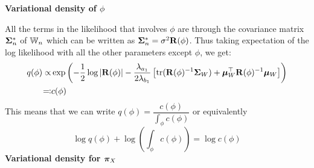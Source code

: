 \documentclass[numsec,webpdf,modern,medium,namedate]{oup-authoring-template}
\theoremstyle{thmstyleone}%
\theoremstyle{thmstyletwo}%
\theoremstyle{thmstylethree}%
\begin{document}
\textbf{Variational density of $\phi$}

All the terms in the likelihood that involves $\phi$ are through the covariance matrix $\boldsymbol{\Sigma}_n^\ast$ of $\mathbb{W}_n$ which can be written as $\boldsymbol{\Sigma}_n^\ast = \sigma^2 \mathbf{R}(\phi)$. Thus taking expectation of the log likelihood with all the other parameters except $\phi$, we get:
\begin{equation}\label{eq:vi-density-phi}
\begin{split}
q(\phi) \propto&  \exp\left(-\frac{1}{2} \log |\mathbf{R}(\phi)| - \frac{\lambda_{a_1}}{2\lambda_{b_1}} \left[\mathrm{tr}(\mathbf{R}(\phi)^{-1} \boldsymbol{\Sigma}_W) + \boldsymbol{\mu}_W^\top \mathbf{R}(\phi)^{-1} \boldsymbol{\mu}_W\right]\right)\\
\eqqcolon & c(\phi) 
\end{split}
\end{equation}
This means that we can write $q(\phi) = \dfrac{c(\phi)}{\int_\phi c(\phi)}$ or equivalently 
\begin{equation}\label{eq:phi-vd-log}
 \log q(\phi) + \log \left(\int_\phi c(\phi)\right) = \log c(\phi)   
\end{equation}
\textbf{Variational density for $\boldsymbol{\pi}_X$}
\end{document}
